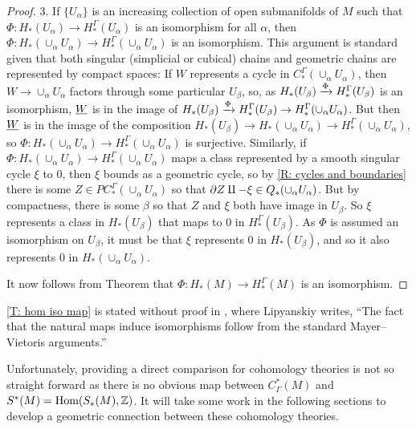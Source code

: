\begin{proof}
	3.
	If $\{U_\alpha\}$ is an increasing collection of open submanifolds of $M$ such that $\Phi \colon H_*(U_\alpha) \to H_*^\Gamma(U_\alpha)$ is an isomorphism for all $\alpha$, then $\Phi \colon H_*(\cup_\alpha U_\alpha) \to H_*^\Gamma(\cup_\alpha U_\alpha)$ is an isomorphism.
	This argument is standard given that both singular (simplicial or cubical) chains and geometric chains are represented by compact spaces: If $W$ represents a cycle in $C_*^\Gamma(\cup_\alpha U_\alpha)$, then $W \to \cup_\alpha U_\alpha$ factors through some particular $U_\beta$, so, as $H_*(U_\beta) \xrightarrow{\Phi}H_*^\Gamma(U_\beta)$ is an isomorphism, $\underline{W}$ is in the image of $H_*(U_\beta) \xrightarrow{\Phi}H_*^\Gamma(U_\beta) \to H_*^\Gamma(\cup_\alpha U_\alpha)$.
	But then $\underline{W}$ is in the image of the composition $H_*(U_\beta) \to H_*(\cup_\alpha U_\alpha) \to H_*^\Gamma(\cup_\alpha U_\alpha)$, so $\Phi \colon H_*(\cup_\alpha U_\alpha) \to H_*^\Gamma(\cup_\alpha U_\alpha)$ is surjective.
	Similarly, if $\Phi \colon H_*(\cup_\alpha U_\alpha) \to H_*^\Gamma(\cup_\alpha U_\alpha)$ maps a class represented by a smooth singular cycle $\xi$ to $0$, then $\xi$ bounds as a geometric cycle, so by \cref{R: cycles and boundaries} there is some $Z \in PC_*^\Gamma(\cup_\alpha U_\alpha)$ so that $\partial Z \amalg -\xi \in Q_*(\cup_\alpha U_\alpha)$.
	But by compactness, there is some $\beta$ so that $Z$ and $\xi$ both have image in $U_\beta$.
	So $\xi$ represents a class in $H_*(U_\beta)$ that maps to $0$ in $H_*^\Gamma(U_\beta)$.
	As $\Phi$ is assumed an isomorphism on $U_\beta$, it must be that $\xi$ represents $0$ in $H_*(U_\beta)$, and so it also represents $0$ in $H_*(\cup_\alpha U_\alpha)$.

	It now follows from Theorem \cite[5.1.1]{Frie20} that $\Phi: H_*(M) \to H_*^\Gamma(M)$ is an isomorphism.
\end{proof}

\cref{T: hom iso map} is stated without proof in \cite[Section 10]{Lipy14}, where
Lipyanskiy writes, ``The fact that the natural maps induce isomorphisms follow from the standard Mayer--Vietoris arguments.''

Unfortunately, providing a direct comparison for cohomology theories is not so straight forward as there is no obvious map between $C^*_\Gamma(M)$ and $S^*(M) = \textup{Hom}(S_*(M),\mathbb{Z})$.
It will take some work in the following sections to develop a geometric connection between these cohomology theories.

